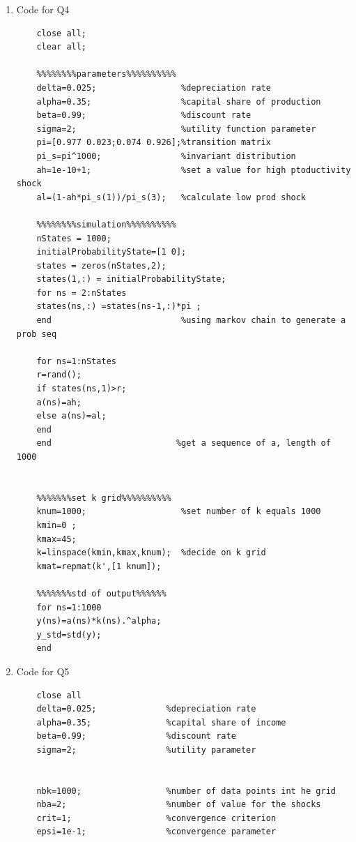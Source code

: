 \documentclass[12pt]{article}
\begin{document}
\begin{enumerate}
\begin{verbatim}
	figure
	plot(k,vfnh,'g');
	xlabel('k');
	ylabel('value function');
	title('value functions for high state');
	
	figure
	plot (k,vfnl,'b');
	xlabel('k');
	ylabel('value function');
	title('value functions for low state');
	
	
	figure 
	plot (k, gh,'g');
	xlabel('k');
	ylabel('policy function');
	title('policy functions for high state and low state') ;
	hold on;
	plot(k , gl,'b');
	hold off;
	\end{verbatim}
	
	\item[2.] Code for Q4
	\begin{verbatim}
	close all;
	clear all;
	
	%%%%%%%%parameters%%%%%%%%%%
	delta=0.025;                 %depreciation rate
	alpha=0.35;                  %capital share of production
	beta=0.99;                   %discount rate
	sigma=2;                     %utility function parameter
	pi=[0.977 0.023;0.074 0.926];%transition matrix
	pi_s=pi^1000;                %invariant distribution
	ah=1e-10+1;                  %set a value for high ptoductivity shock
	al=(1-ah*pi_s(1))/pi_s(3);   %calculate low prod shock
	
	%%%%%%%%simulation%%%%%%%%%%
	nStates = 1000;
	initialProbabilityState=[1 0];
	states = zeros(nStates,2);
	states(1,:) = initialProbabilityState;
	for ns = 2:nStates
	states(ns,:) =states(ns-1,:)*pi ;
	end                          %using markov chain to generate a prob seq
	
	for ns=1:nStates
	r=rand();
	if states(ns,1)>r;
	a(ns)=ah;
	else a(ns)=al;
	end
	end                         %get a sequence of a, length of 1000
	
	
	%%%%%%%set k grid%%%%%%%%%%
	knum=1000;                   %set number of k equals 1000
	kmin=0 ;                    
	kmax=45;
	k=linspace(kmin,kmax,knum);  %decide on k grid
	kmat=repmat(k',[1 knum]); 
	
	%%%%%%%std of output%%%%%%
	for ns=1:1000
	y(ns)=a(ns)*k(ns).^alpha;
	y_std=std(y);
	end
	\end{verbatim}
	\item[3.]Code for Q5
	\begin{verbatim}
	close all
	delta=0.025;              %depreciation rate
	alpha=0.35;               %capital share of income
	beta=0.99;                %discount rate
	sigma=2;                  %utility parameter
	
	
	nbk=1000;                 %number of data points int he grid
	nba=2;                    %number of value for the shocks
	crit=1;                   %convergence criterion
	epsi=1e-1;                %convergence parameter
	

\end{verbatim}
\end{enumerate}
\end{document}
